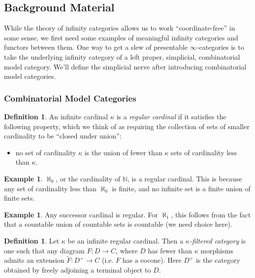 \documentclass[letterpaper]{article}
\theoremstyle{definition}
\newtheorem{example}[lemma]{Example}
\newtheorem{definition}[lemma]{Definition}
\newcommand{\mbb}{\mathbb}
\begin{document}
\subsection{Background Material}

While the theory of infinity categories allows us to work
``coordinate-free'' in some sense, we first need some examples of
meaningful infinity categories and functors between them. One way to
get a slew of presentable $\infty$-categories is to take the underlying
infinity category of a left proper, simplicial, combinatorial model
category. We'll define the simplicial nerve after introducing
combinatorial model categories.

\subsubsection{Combinatorial Model Categories}
\begin{definition}
An infinite cardinal $\kappa$ is a \emph{regular cardinal} if it
satisfies the following property, which we think of as requiring the
collection of sets of smaller cardinality to be ``closed
under union'':
\begin{itemize}
\item no set of cardinality $\kappa$ is the union of fewer than
  $\kappa$ sets of cardinality less than $\kappa$.
\end{itemize}
\end{definition}

\begin{example}
$\aleph_0$, or the cardinality of $\mbb N$, is a regular
cardinal. This is because any set of cardinality less than $\aleph_0$
is finite, and no infinite set is a finite union of finite sets.
\end{example}

\begin{example}
Any successor cardinal is regular. For $\aleph_1$, this follows from
the fact that a countable union of countable sets is countable (we
need choice here).
\end{example}



\begin{definition}
Let $\kappa$ be an infinite regular cardinal. Then a
\emph{$\kappa$-filtered category} is one such that any diagram $F :D
\rightarrow C$, where $D$ has fewer than $\kappa$ morphisms admits an
extension $\widetilde F: D^+ \rightarrow C$ (i.e. $F$ has a
cocone). Here $D^+$ is the category obtained by freely adjoining a
terminal object to $D$.
\end{definition}
\end{document}
